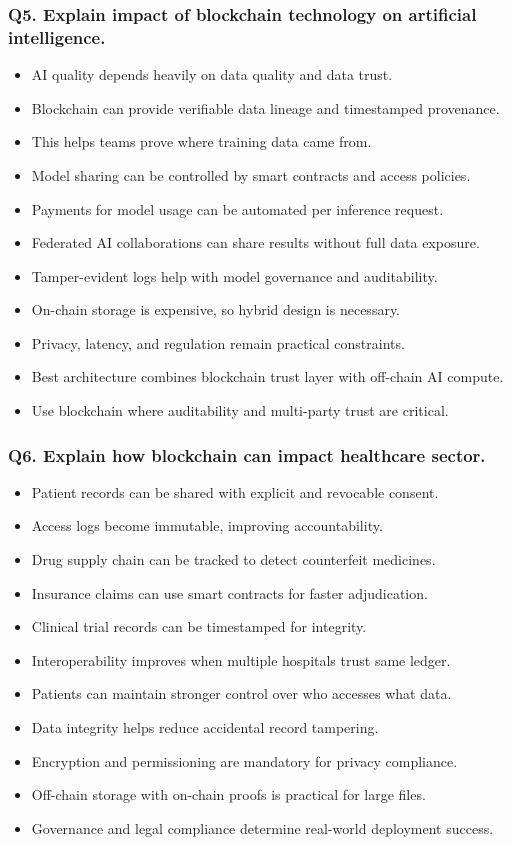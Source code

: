 \documentclass[12pt,a4paper]{article}
\begin{document}
\subsubsection*{Q5. Explain impact of blockchain technology on artificial intelligence.}
\begin{itemize}
\item AI quality depends heavily on data quality and data trust.
\item Blockchain can provide verifiable data lineage and timestamped provenance.
\item This helps teams prove where training data came from.
\item Model sharing can be controlled by smart contracts and access policies.
\item Payments for model usage can be automated per inference request.
\item Federated AI collaborations can share results without full data exposure.
\item Tamper-evident logs help with model governance and auditability.
\item On-chain storage is expensive, so hybrid design is necessary.
\item Privacy, latency, and regulation remain practical constraints.
\item Best architecture combines blockchain trust layer with off-chain AI compute.
\item Use blockchain where auditability and multi-party trust are critical.
\end{itemize}

\subsubsection*{Q6. Explain how blockchain can impact healthcare sector.}
\begin{itemize}
\item Patient records can be shared with explicit and revocable consent.
\item Access logs become immutable, improving accountability.
\item Drug supply chain can be tracked to detect counterfeit medicines.
\item Insurance claims can use smart contracts for faster adjudication.
\item Clinical trial records can be timestamped for integrity.
\item Interoperability improves when multiple hospitals trust same ledger.
\item Patients can maintain stronger control over who accesses what data.
\item Data integrity helps reduce accidental record tampering.
\item Encryption and permissioning are mandatory for privacy compliance.
\item Off-chain storage with on-chain proofs is practical for large files.
\item Governance and legal compliance determine real-world deployment success.
\end{itemize}
\end{document}
